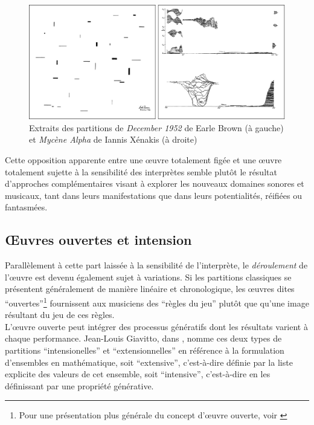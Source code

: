 \begin{figure}[!htbp]
	\captionsetup{format=plain}
	\includegraphics[width=\textwidth]{gfx/notation/Brown-Xenakis-Paysage.png}
	\caption{Extraits des partitions de \textit{December 1952} de Earle Brown (à gauche) et \textit{Mycène Alpha} de Iannis Xénakis (à droite)}
	\label{fig:notation:brown-xenakis}
\end{figure}

\noindent Cette opposition apparente entre une œuvre totalement figée et une œuvre totalement sujette à la sensibilité des interprètes semble plutôt le résultat d'approches complémentaires visant à explorer les nouveaux domaines sonores et musicaux, tant dans leurs manifestations que dans leurs potentialités, réifiées ou fantasmées.\\

\subsection{Œuvres ouvertes et intension}

\noindent Parallèlement à cette part laissée à la sensibilité de l'interprète, le \textit{déroulement} de l'œuvre est devenu également sujet à variations. Si les partitions classiques se présentent généralement de manière linéaire et chronologique, les œuvres dites ``ouvertes''\footnote{Pour une présentation plus générale du concept d'œuvre ouverte, voir \cite{eco_oeuvre_2015}} fournissent aux musiciens des ``règles du jeu'' plutôt que qu'une image résultant du jeu de ces règles.\\
\indent L'œuvre ouverte peut intégrer des processus génératifs dont les résultats varient à chaque performance. Jean-Louis Giavitto, dans \cite{giavitto_du_2014}, nomme ces deux types de partitions ``intensionelles'' et ``extensionnelles'' en référence à la formulation d'ensembles en mathématique, soit ``extensive'', c'est-à-dire définie par la liste explicite des valeurs de cet ensemble, soit ``intensive'', c'est-à-dire en les définissant par une propriété générative.

